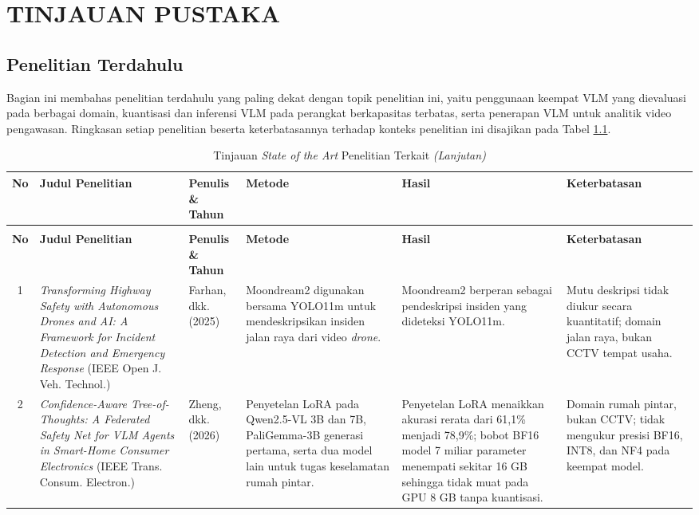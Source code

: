 \chapter{TINJAUAN PUSTAKA}

\section{Penelitian Terdahulu}
Bagian ini membahas penelitian terdahulu yang paling dekat dengan topik penelitian ini, yaitu penggunaan keempat VLM yang dievaluasi pada berbagai domain, kuantisasi dan inferensi VLM pada perangkat berkapasitas terbatas, serta penerapan VLM untuk analitik video pengawasan. Ringkasan setiap penelitian beserta keterbatasannya terhadap konteks penelitian ini disajikan pada Tabel \ref{tab:sota}.

{\renewcommand{\arraystretch}{1.3}
\begin{longtable}{|c|p{3.3cm}|p{2cm}|p{3.4cm}|p{3.2cm}|p{2.6cm}|}
    \caption{Tinjauan \textit{State of the Art} Penelitian Terkait}
    \label{tab:sota} \\
    \hline
    \textbf{No} & \textbf{Judul Penelitian} & \textbf{Penulis \& Tahun} & \textbf{Metode} & \textbf{Hasil} & \textbf{Keterbatasan} \\
    \hline
    \endfirsthead
    \caption[]{Tinjauan \textit{State of the Art} Penelitian Terkait \textit{(Lanjutan)}} \\
    \hline
    \textbf{No} & \textbf{Judul Penelitian} & \textbf{Penulis \& Tahun} & \textbf{Metode} & \textbf{Hasil} & \textbf{Keterbatasan} \\
    \hline
    \endhead
    1 & \textit{Transforming Highway Safety with Autonomous Drones and AI: A Framework for Incident Detection and Emergency Response} (IEEE Open J. Veh. Technol.) & Farhan, dkk. (2025) \cite{ref31} & Moondream2 digunakan bersama YOLO11m untuk mendeskripsikan insiden jalan raya dari video \textit{drone}. & Moondream2 berperan sebagai pendeskripsi insiden yang dideteksi YOLO11m. & Mutu deskripsi tidak diukur secara kuantitatif; domain jalan raya, bukan CCTV tempat usaha. \\
    \hline
    2 & \textit{Confidence-Aware Tree-of-Thoughts: A Federated Safety Net for VLM Agents in Smart-Home Consumer Electronics} (IEEE Trans. Consum. Electron.) & Zheng, dkk. (2026) \cite{ref32} & Penyetelan LoRA pada Qwen2.5-VL 3B dan 7B, PaliGemma-3B generasi pertama, serta dua model lain untuk tugas keselamatan rumah pintar. & Penyetelan LoRA menaikkan akurasi rerata dari 61,1\% menjadi 78,9\%; bobot BF16 model 7 miliar parameter menempati sekitar 16 GB sehingga tidak muat pada GPU 8 GB tanpa kuantisasi. & Domain rumah pintar, bukan CCTV; tidak mengukur presisi BF16, INT8, dan NF4 pada keempat model. \\

\end{longtable}}
